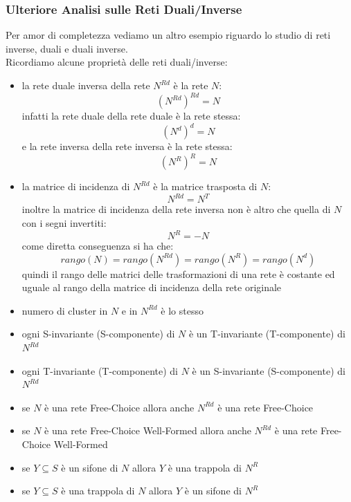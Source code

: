 \documentclass[a4paper,12pt, oneside]{book}
\begin{document}
\subsubsection{Ulteriore Analisi sulle Reti Duali/Inverse}
Per amor di completezza vediamo un altro esempio riguardo lo studio di reti
inverse, duali e duali inverse.\\
Ricordiamo alcune proprietà delle reti duali/inverse:
\begin{itemize}
  \item la rete duale inversa della rete $N^{Rd}$ è la rete $N$:
  \[(N^{Rd})^{Rd}=N\]
  infatti la rete duale della rete duale è la rete stessa:
  \[(N^d)^d=N\]
  e la rete inversa della rete inversa è la rete stessa:
  \[(N^R)^R=N\]
  \item la matrice di incidenza di $N^{Rd}$ è la matrice trasposta di $N$:
  \[N^{Rd}=N^T\]
  inoltre la matrice di incidenza della rete inversa non è altro che quella di
  $N$ con i segni invertiti:
  \[N^R=-N\]
  come diretta conseguenza si ha che:
  \[rango(N)=rango(N^{Rd})=rango(N^R)=rango(N^d)\]
  quindi il rango delle matrici delle trasformazioni di una rete è costante ed
  uguale al rango della matrice di incidenza della rete originale
  \item numero di cluster in $N$ e in $N^{Rd}$ è lo stesso
  \item ogni S-invariante (S-componente) di $N$ è un T-invariante (T-componente)
  di $N^{Rd}$
  \item ogni T-invariante (T-componente) di $N$ è un S-invariante (S-componente)
  di $N^{Rd}$
  \item se $N$ è una rete Free-Choice allora anche $N^{Rd}$ è una rete
  Free-Choice
  \item se $N$ è una rete Free-Choice Well-Formed allora anche $N^{Rd}$ è una
  rete Free-Choice Well-Formed
  \item se $Y\subseteq S$ è un sifone di $N$ allora $Y$ è una trappola di $N^R$
  \item se $Y\subseteq S$ è una trappola di $N$ allora $Y$ è un sifone di $N^R$
\end{itemize}
\end{document}
